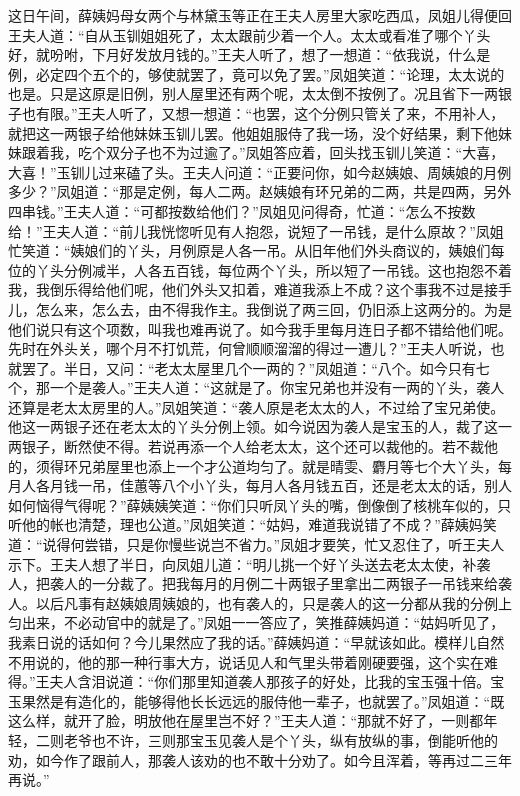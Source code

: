 \documentclass[12pt,oneside]{book}
\begin{document}
这日午间，薛姨妈母女两个与林黛玉等正在王夫人房里大家吃西瓜，凤姐儿得便回王夫人道：“自从玉钏姐姐死了，太太跟前少着一个人。太太或看准了哪个丫头好，就吩咐，下月好发放月钱的。”王夫人听了，想了一想道：“依我说，什么是例，必定四个五个的，够使就罢了，竟可以免了罢。”凤姐笑道：“论理，太太说的也是。只是这原是旧例，别人屋里还有两个呢，太太倒不按例了。况且省下一两银子也有限。”王夫人听了，又想一想道：“也罢，这个分例只管关了来，不用补人，就把这一两银子给他妹妹玉钏儿罢。他姐姐服侍了我一场，没个好结果，剩下他妹妹跟着我，吃个双分子也不为过逾了。”凤姐答应着，回头找玉钏儿笑道：“大喜，大喜！”玉钏儿过来磕了头。王夫人问道：“正要问你，如今赵姨娘、周姨娘的月例多少？”凤姐道：“那是定例，每人二两。赵姨娘有环兄弟的二两，共是四两，另外四串钱。”王夫人道：“可都按数给他们？”凤姐见问得奇，忙道：“怎么不按数给！”王夫人道：“前儿我恍惚听见有人抱怨，说短了一吊钱，是什么原故？”凤姐忙笑道：“姨娘们的丫头，月例原是人各一吊。从旧年他们外头商议的，姨娘们每位的丫头分例减半，人各五百钱，每位两个丫头，所以短了一吊钱。这也抱怨不着我，我倒乐得给他们呢，他们外头又扣着，难道我添上不成？这个事我不过是接手儿，怎么来，怎么去，由不得我作主。我倒说了两三回，仍旧添上这两分的。为是他们说只有这个项数，叫我也难再说了。如今我手里每月连日子都不错给他们呢。先时在外头关，哪个月不打饥荒，何曾顺顺溜溜的得过一遭儿？”王夫人听说，也就罢了。半日，又问：“老太太屋里几个一两的？”凤姐道：“八个。如今只有七个，那一个是袭人。”王夫人道：“这就是了。你宝兄弟也并没有一两的丫头，袭人还算是老太太房里的人。”凤姐笑道：“袭人原是老太太的人，不过给了宝兄弟使。他这一两银子还在老太太的丫头分例上领。如今说因为袭人是宝玉的人，裁了这一两银子，断然使不得。若说再添一个人给老太太，这个还可以裁他的。若不裁他的，须得环兄弟屋里也添上一个才公道均匀了。就是晴雯、麝月等七个大丫头，每月人各月钱一吊，佳蕙等八个小丫头，每月人各月钱五百，还是老太太的话，别人如何恼得气得呢？”薛姨姨笑道：“你们只听凤丫头的嘴，倒像倒了核桃车似的，只听他的帐也清楚，理也公道。”凤姐笑道：“姑妈，难道我说错了不成？”薛姨妈笑道：“说得何尝错，只是你慢些说岂不省力。”凤姐才要笑，忙又忍住了，听王夫人示下。王夫人想了半日，向凤姐儿道：“明儿挑一个好丫头送去老太太使，补袭人，把袭人的一分裁了。把我每月的月例二十两银子里拿出二两银子一吊钱来给袭人。以后凡事有赵姨娘周姨娘的，也有袭人的，只是袭人的这一分都从我的分例上匀出来，不必动官中的就是了。”凤姐一一答应了，笑推薛姨妈道：“姑妈听见了，我素日说的话如何？今儿果然应了我的话。”薛姨妈道：“早就该如此。模样儿自然不用说的，他的那一种行事大方，说话见人和气里头带着刚硬要强，这个实在难得。”王夫人含泪说道：“你们那里知道袭人那孩子的好处，比我的宝玉强十倍。宝玉果然是有造化的，能够得他长长远远的服侍他一辈子，也就罢了。”凤姐道：“既这么样，就开了脸，明放他在屋里岂不好？”王夫人道：“那就不好了，一则都年轻，二则老爷也不许，三则那宝玉见袭人是个丫头，纵有放纵的事，倒能听他的劝，如今作了跟前人，那袭人该劝的也不敢十分劝了。如今且浑着，等再过二三年再说。”
\end{document}
